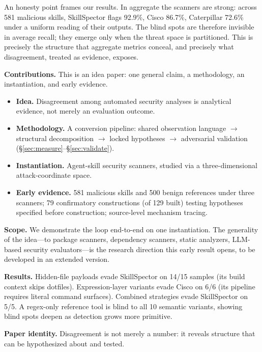 \documentclass[sigconf,nonacm]{acmart}
\begin{document}
An honesty point frames our results.
In aggregate the scanners are strong: across 581 malicious skills, SkillSpector flags 92.9\%, Cisco 86.7\%, Caterpillar 72.6\% under a uniform reading of their outputs.
The blind spots are therefore invisible in average recall; they emerge only when the threat space is partitioned.
This is precisely the structure that aggregate metrics conceal, and precisely what disagreement, treated as evidence, exposes.

\noindent\textbf{Contributions.} This is an idea paper: one general claim, a methodology, an instantiation, and early evidence.
\begin{itemize}
  \item \textbf{Idea.} Disagreement among automated security analyses is analytical evidence, not merely an evaluation outcome.
  \item \textbf{Methodology.} A conversion pipeline: shared observation language $\rightarrow$ structural decomposition $\rightarrow$ locked hypotheses $\rightarrow$ adversarial validation (\S\ref{sec:measure}--\S\ref{sec:validate}).
  \item \textbf{Instantiation.} Agent-skill security scanners, studied via a three-dimensional attack-coordinate space.
  \item \textbf{Early evidence.} 581 malicious skills and 500 benign references under three scanners; 79 confirmatory constructions (of 129 built) testing hypotheses specified before construction; source-level mechanism tracing.
\end{itemize}

\noindent\textbf{Scope.} We demonstrate the loop end-to-end on one instantiation.
The generality of the idea---to package scanners, dependency scanners, static analyzers, LLM-based security evaluators---is the research direction this early result opens, to be developed in an extended version.

\noindent\textbf{Results.} Hidden-file payloads evade SkillSpector on 14/15 samples (its build context skips dotfiles). Expression-layer variants evade Cisco on 6/6 (its pipeline requires literal command surfaces). Combined strategies evade SkillSpector on 5/5.
A regex-only reference tool is blind to all 10 semantic variants, showing blind spots deepen as detection grows more primitive.

\noindent\textbf{Paper identity.} Disagreement is not merely a number: it reveals structure that can be hypothesized about and tested.

\end{document}

